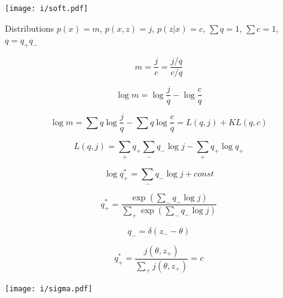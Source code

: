 \begin{center}
\texttt{[image: i/soft.pdf]}
\end{center}
\eframe


Distributions $p(x) = m$, $p(x, z) = j$, $p(z | x) = c$, $\sum q = 1$, $\sum c = 1$, $q = q_+ q_- $

\begin{equation*}
m = \frac{j}{c} = \frac{j/q}{c/q}
\end{equation*}

\begin{equation*}
\log m = \log \frac{j}{q} - \log \frac{c}{q}
\end{equation*}

\begin{equation*}
\log m = \sum q \log \frac{j}{q} - \sum q \log \frac{c}{q} = L(q, j) + KL(q, c)
\end{equation*}

\eframe

\begin{equation*}
L(q, j) = \sum_+ q_+  \sum_-  q_- \log j -  \sum_+ q_+  \log q_+
\end{equation*}

\begin{equation*}
\log q_+^* = \sum_- q_- \log j   + const
\end{equation*}

\begin{equation*}
q_+^* = \frac{ \exp( \sum_- q_- \log j)}{    \sum_+  \exp(\sum_- q_ - \log j) }
\end{equation*}

\begin{equation*}
q_- = \delta(z_- - \theta)
\end{equation*}

\begin{equation*}
q_+^* = \frac{ j(\theta, z_+)}{  \sum_+ j(\theta, z_+) } = c
\end{equation*}
\eframe

\begin{center}
\texttt{[image: i/sigma.pdf]}
\end{center}

\eframe


